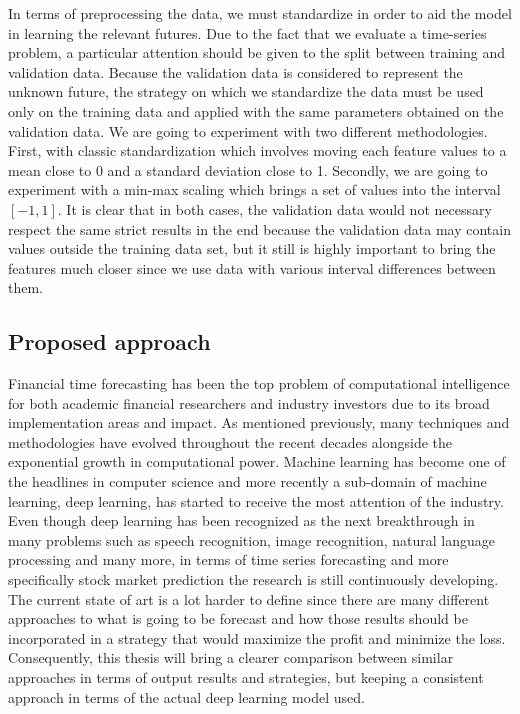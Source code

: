 In terms of preprocessing the data, we must standardize in order to aid the model in learning the relevant futures. Due to the fact that we evaluate a time-series problem, a particular attention should be given to the split between training and validation data. Because the validation data is considered to represent the unknown future, the strategy on which we standardize the data must be used only on the training data and applied with the same parameters obtained on the validation data. We are going to experiment with two different methodologies. First, with classic standardization which involves moving each feature values to a mean close to 0 and a standard deviation close to 1. Secondly, we are going to experiment with a min-max scaling which brings a set of values into the interval $[-1, 1]$. It is clear that in both cases, the validation data would not necessary respect the same strict results in the end because the validation data may contain values outside the training data set, but it still is highly important to bring the features much closer since we use data with various interval differences between them.

\subsection{Proposed approach}
Financial time forecasting has been the top problem of computational intelligence for both academic financial researchers and industry investors due to its broad implementation areas and impact. As mentioned previously, many techniques and methodologies have evolved throughout the recent decades alongside the exponential growth in computational power. Machine learning has become one of the headlines in computer science and more recently a sub-domain of machine learning, deep learning, has started to receive the most attention of the industry. Even though deep learning has been recognized as the next breakthrough in many problems such as speech recognition, image recognition, natural language processing and many more, in terms of time series forecasting and more specifically stock market prediction the research is still continuously developing. The current state of art is a lot harder to define since there are many different approaches to what is going to be forecast and how those results should be incorporated in a strategy that would maximize the profit and minimize the loss. Consequently, this thesis will bring a clearer comparison between similar approaches in terms of output results and strategies, but keeping a consistent approach in terms of the actual deep learning model used.

